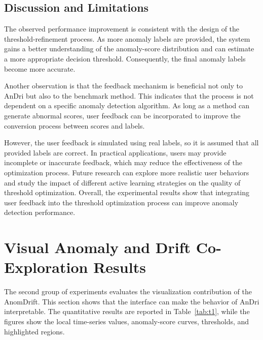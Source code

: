 \subsection{Discussion and Limitations}

The observed performance improvement is consistent with the design of the threshold-refinement process. As more anomaly labels are provided, the system gains a better understanding of the anomaly-score distribution and can estimate a more appropriate decision threshold. Consequently, the final anomaly labels become more accurate.

Another observation is that the feedback mechanism is beneficial not only to AnDri but also to the benchmark method. This indicates that the process is not dependent on a specific anomaly detection algorithm. As long as a method can generate abnormal scores, user feedback can be incorporated to improve the conversion process between scores and labels.

However, the user feedback is simulated using real labels, so it is assumed that all provided labels are correct. In practical applications, users may provide incomplete or inaccurate feedback, which may reduce the effectiveness of the optimization process. Future research can explore more realistic user behaviors and study the impact of different active learning strategies on the quality of threshold optimization. Overall, the experimental results show that integrating user feedback into the threshold optimization process can improve anomaly detection performance. 


\section{Visual Anomaly and Drift Co-Exploration Results}

The second group of experiments evaluates the visualization contribution of the AnomDrift. This section shows that the interface can make the behavior of AnDri interpretable. The quantitative results are reported in Table~\ref{tab:t1}, while the figures show the local time-series values, anomaly-score curves, thresholds, and highlighted regions.

